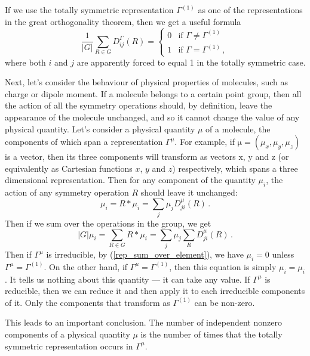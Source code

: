 \documentclass{article}
\theoremstyle{plain}\theoremheaderfont{\normalfont\itshape}\theorembodyfont{\rmfamily}\theoremseparator{.}\newtheorem*{rem}{Remark}\newtheorem*{ex}{Example}\newtheorem*{proof}{Proof}\newtheorem*{altp}{Alternative proof}
\theoremstyle{plain}\theoremheaderfont{\normalfont\bfseries}\theorembodyfont{\rmfamily}\theoremseparator{.}\newtheorem{thm}{Theorem}[section]\newtheorem{lem}[thm]{Lemma}\newtheorem{prop}[thm]{Proposition}\newtheorem*{cor}{Corollary}\newtheorem{defn}[thm]{Definition}\newtheorem{clm}[thm]{Claim}\newtheorem{clminproof}{Claim}\newtheorem*{law}{Law}\newtheorem{pos}[thm]{Postulate}
\theoremstyle{break}\theoremheaderfont{\normalfont\itshape}\theorembodyfont{\rmfamily}\theoremseparator{.\medskip}\newtheorem*{proofskip}{Proof}\newtheorem*{exs}{Examples}\newtheorem*{rems}{Remarks}
\theoremstyle{break}\theoremheaderfont{\normalfont\bfseries}\theorembodyfont{\rmfamily}\theoremseparator{.\medskip}\newtheorem{lemskip}[thm]{Lemma}\newtheorem{defnskip}[thm]{Definition}\newtheorem{propskip}[thm]{Proposition}\newtheorem{thmskip}[thm]{Theorem}
\numberwithin{equation}{section}
\newcommand{\vb}[1]{\bm{\mathrm{#1}}}
\newcommand{\abs}[1]{\left| #1 \right|}
\begin{document}
    If we use the totally symmetric representation \(\Gamma^{(1)}\) as one of the representations in the great orthogonality theorem, then we get a useful formula
    \begin{equation}\label{rep_sum_over_element}
        \frac{1}{\abs{G}}\sum_{R\in G}D_{ij}^{\Gamma}(R)=\begin{cases}
            0 & \text{if }\Gamma\ne \Gamma^{(1)} \\
            1 & \text{if }\Gamma=\Gamma^{(1)}\,,
        \end{cases}
    \end{equation}
    where both \(i\) and \(j\) are apparently forced to equal 1 in the totally symmetric case.

    Next, let's consider the behaviour of physical properties of molecules, such as charge or dipole moment. If a molecule belongs to a certain point group, then all the action of all the symmetry operations should, by definition, leave the appearance of the molecule unchanged, and so it cannot change the value of any physical quantity. Let's consider a physical quantity \(\mu\) of a molecule, the components of which span a representation \(\Gamma^\mu\). For example, if \(\vb{\mu}=(\mu_x,\mu_y,\mu_z)\) is a vector, then its three components will transform as vectors \(\vb{x}\), \(\vb{y}\) and \(\vb{z}\) (or equivalently as Cartesian functions \(x\), \(y\) and \(z\)) respectively, which spans a three dimensional representation. Then for any component of the quantity \(\mu_i\), the action of any symmetry operation \(R\) should leave it unchanged:
    \begin{equation}
        \mu_i=R*\mu_i=\sum_j\mu_j D_{ji}^\mu(R)\,.
    \end{equation}
    Then if we sum over the operations in the group, we get
    \begin{equation}
        \abs{G}\mu_i=\sum_{R\in G}R*\mu_i=\sum_{j}\mu_j\sum_{R}D_{ji}^\mu(R)\,.
    \end{equation}
    Then if \(\Gamma^\mu\) is irreducible, by (\ref{rep_sum_over_element}), we have \(\mu_i=0\) unless \(\Gamma^\mu=\Gamma^{(1)}\). On the other hand, if \(\Gamma^\mu=\Gamma^{(1)}\), then this equation is simply \(\mu_i=\mu_i\). It tells us nothing about this quantity --- it can take any value. If \(\Gamma^\mu\) is reducible, then we can reduce it and then apply it to each irreducible components of it. Only the components that transform as \(\Gamma^{(1)}\) can be non-zero.
    
    This leads to an important conclusion. The number of independent nonzero components of a physical quantity \(\mu\) is the number of times that the totally symmetric representation occurs in \(\Gamma^\mu\).
\end{document}
